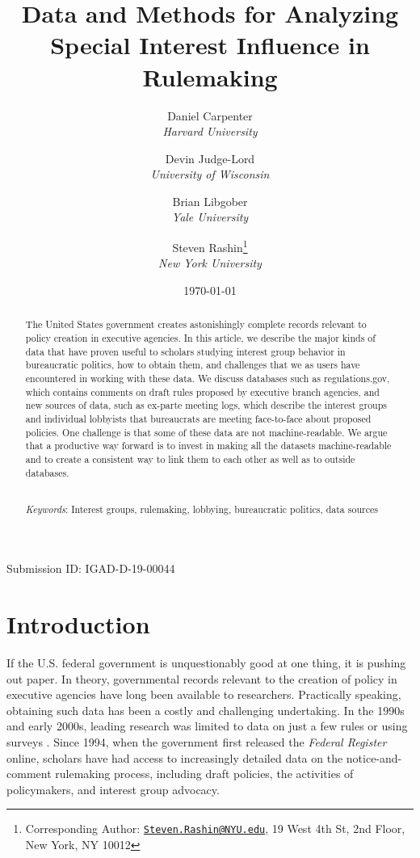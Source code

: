 \documentclass[
      12pt,
        ]{article}
\title{Data and Methods for Analyzing Special Interest Influence in Rulemaking}
\author{ %
            Daniel Carpenter  \\ \emph{Harvard University} 
             \and 
            Devin Judge-Lord  \\ \emph{University of Wisconsin} 
             \and 
            Brian Libgober  \\ \emph{Yale University} 
             \and 
            Steven Rashin\footnote{Corresponding Author:
\href{mailto:Steven.Rashin@NYU.edu}{\nolinkurl{Steven.Rashin@NYU.edu}},
19 West 4th St, 2nd Floor, New York, NY 10012}  \\ \emph{New York University} 
            }
\date{\today}
\begin{document}
 


  \maketitle




  \begin{abstract}
    \noindent The United States government creates astonishingly complete records
relevant to policy creation in executive agencies. In this article, we
describe the major kinds of data that have proven useful to scholars
studying interest group behavior in bureaucratic politics, how to obtain
them, and challenges that we as users have encountered in working with
these data. We discuss databases such as regulations.gov, which contains
comments on draft rules proposed by executive branch agencies, and new
sources of data, such as ex-parte meeting logs, which describe the
interest groups and individual lobbyists that bureaucrats are meeting
face-to-face about proposed policies. One challenge is that some of
these data are not machine-readable. We argue that a productive way
forward is to invest in making all the datasets machine-readable and to
create a consistent way to link them to each other as well as to outside
databases. 

          \hfill \\ 
      \noindent \emph{Keywords}: Interest groups, rulemaking, lobbying, bureaucratic politics, data
sources 
    
  \end{abstract}









  \newpage

\noindent 
      \doublespacing 
    \noindent Submission ID: IGAD-D-19-00044

\hypertarget{introduction}{%
\section{Introduction}\label{introduction}}

If the U.S. federal government is unquestionably good at one thing, it
is pushing out paper. In theory, governmental records relevant to the
creation of policy in executive agencies have long been available to
researchers. Practically speaking, obtaining such data has been a costly
and challenging undertaking. In the 1990s and early 2000s, leading
research was limited to data on just a few rules
\citep[e.g.,][]{GoldenJPART1998} or using surveys
\citep[e.g.,][]{FurlongJPART2004}. Since 1994, when the government first
released the \emph{Federal Register} online, scholars have had access to
increasingly detailed data on the notice-and-comment rulemaking process,
including draft policies, the activities of policymakers, and interest
group advocacy.
\end{document}
